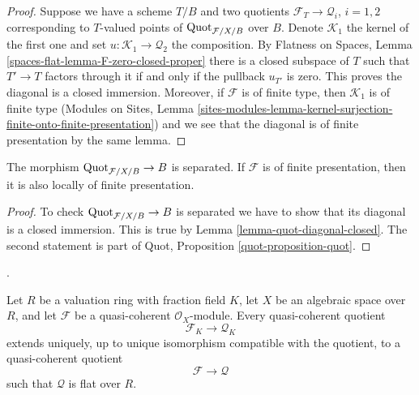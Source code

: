 \begin{proof}
Suppose we have a scheme $T/B$ and two quotients
$\mathcal{F}_T \to \mathcal{Q}_i$, $i = 1, 2$ corresponding
to $T$-valued points of $\mathrm{Quot}_{\mathcal{F}/X/B}$ over $B$.
Denote $\mathcal{K}_1$ the kernel of the first one and set
$u : \mathcal{K}_1 \to \mathcal{Q}_2$ the composition.
By Flatness on Spaces, Lemma \ref{spaces-flat-lemma-F-zero-closed-proper}
there is a closed subspace of $T$ such that $T' \to T$
factors through it if and only if the pullback $u_{T'}$ is zero.
This proves the diagonal is a closed immersion.
Moreover, if $\mathcal{F}$ is of finite type, then
$\mathcal{K}_1$ is of finite type
(Modules on Sites, Lemma
\ref{sites-modules-lemma-kernel-surjection-finite-onto-finite-presentation})
and we see that the diagonal is of finite presentation by
the same lemma.
\end{proof}

\begin{lemma}
\label{lemma-quot-s-lfp}
The morphism $\mathrm{Quot}_{\mathcal{F}/X/B} \to B$ is separated.
If $\mathcal{F}$ is of finite presentation, then it is also
locally of finite presentation.
\end{lemma}

\begin{proof}
To check $\mathrm{Quot}_{\mathcal{F}/X/B} \to B$ is separated we have to
show that its diagonal is a closed immersion. This
is true by Lemma \ref{lemma-quot-diagonal-closed}.
The second statement is part of
Quot, Proposition \ref{quot-proposition-quot}.
\end{proof}

\begin{lemma}
\label{lemma-quotient-extension-valuation-ring}
\begin{reference}
\cite[Expos\'e 221, Lemma 3.7, pp. 264--265]{FGA}.
\end{reference}
Let $R$ be a valuation ring with fraction field $K$, let $X$ be an
algebraic space over $R$, and let $\mathcal{F}$ be a quasi-coherent
$\mathcal{O}_X$-module. Every quasi-coherent quotient
$$
\mathcal{F}_K \longrightarrow \mathcal{Q}_K
$$
extends uniquely, up to unique isomorphism compatible with the quotient,
to a quasi-coherent quotient
$$
\mathcal{F} \longrightarrow \mathcal{Q}
$$
such that $\mathcal{Q}$ is flat over $R$.
\end{lemma}

